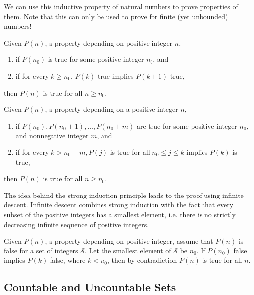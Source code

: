 \documentclass{article}
\begin{document}
    We can use this inductive property of natural numbers to prove properties of them. Note that this can only be used to prove for finite (yet unbounded) numbers! 

    \begin{lemma}
    Given $P(n)$, a property depending on positive integer $n$, 
    \begin{enumerate}
        \item if $P(n_0)$ is true for some positive integer $n_0$, and
        \item if for every $k \geq n_0$, $P(k)$ true implies $P(k+1)$ true, 
    \end{enumerate}
    then $P(n)$ is true for all $n \geq n_0$. 
    \end{lemma}

    \begin{lemma}
    Given $P(n)$, a property depending on a positive integer $n$, 
    \begin{enumerate}
        \item if $P(n_0), P(n_0 + 1), \ldots, P(n_0 + m)$ are true for some positive integer $n_0$, and nonnegative integer $m$, and 
        \item if for every $k > n_0 + m, P(j)$ is true for all $n_0 \leq j \leq k$ implies $P(k)$ is true, 
    \end{enumerate}
    then $P(n)$ is true for all $n \geq n_0$. 
    \end{lemma}

    The idea behind the strong induction principle leads to the proof using infinite descent. Infinite descent combines strong induction with the fact that every subset of the positive integers has a smallest element, i.e. there is no strictly decreasing infinite sequence of positive integers. 

    \begin{lemma}
    Given $P(n)$, a property depending on positive integer, assume that $P(n)$ is false for a set of integers $\mathcal{S}$. Let the smallest element of $\mathcal{S}$ be $n_0$. If $P(n_0)$ false implies $P(k)$ false, where $k < n_0$, then by contradiction $P(n)$ is true for all $n$. 
    \end{lemma}

    \subsection{Countable and Uncountable Sets}
\end{document}

